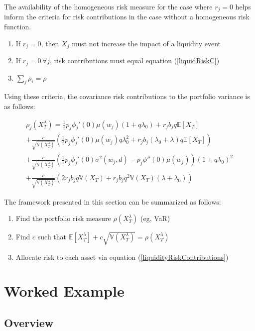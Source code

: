 \documentclass[12pt]{article}
\theoremstyle{definition}
\begin{document}
 The availability of the homogeneous risk measure for the case where \(r_j=0\) helps inform the criteria for risk contributions in the case without a homogeneous risk function.  
\begin{enumerate} \label{criteria}
\item If \(r_j=0\), then \(X_j\) must not increase the impact of a liquidity event

\item  If \(r_j=0\,\forall j\), risk contributions must equal equation (\ref{liquidRiskC})
\item\( \sum_{j} \rho_i =\rho \)
\end{enumerate}

Using these criteria, the covariance risk contributions to the portfolio variance is as follows:

\begin{multline} \label{liquidityRiskContributions}
\rho_j(X_T ^ \lambda)=\frac{1}{i}p_j \phi_j '(0)\mu(w_j) \left(1+q\lambda_0  \right) +r_j b_j q \mathbb{E}[X_T] \\+\frac{c}{\sqrt{\mathbb{V}(X_T ^ {\lambda})}}\left(\frac{1}{i}p_j \phi_j '(0)\mu(w_j) q \lambda_0 ^2 +r_j b_j (\lambda_0+\lambda)q \mathbb{E}[X_T]  \right)\\+\frac{c}{\sqrt{\mathbb{V}(X_T ^ {\lambda})}}\left(\frac{1}{i}p_j \phi_j '(0) \sigma^2(w_j, d)-p_j\phi''(0)   \mu(w_j) \right)(1+q \lambda_0)^2 \\
+\frac{c}{\sqrt{\mathbb{V}(X_T ^ {\lambda})}}\left(2 r_j b_j q \mathbb{V}(X_T)+r_j b_j q^2 \mathbb{V}(X_T)(\lambda+\lambda_0)\right)
\end{multline}


The framework presented in this section can be summarized as follows:
\begin{enumerate}
\item Find the portfolio risk measure \(\rho(X_T ^\lambda)\) (eg, VaR)
\item Find \(c\) such that \(\mathbb{E}\left[X_T ^ \lambda\right]+c \sqrt{\mathbb{V}(X_T ^ \lambda)}=\rho(X_T ^ \lambda)\)
\item Allocate risk to each asset via equation (\ref{liquidityRiskContributions})
\end{enumerate}


\section{Worked Example}
\subsection{Overview}
\end{document}
